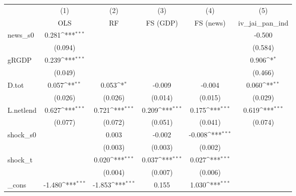 {
\def\sym#1{\ifmmode^{#1}\else\(^{#1}\)\fi}
\begin{tabular}{l*{5}{c}}
\toprule
            &\multicolumn{1}{c}{(1)}&\multicolumn{1}{c}{(2)}&\multicolumn{1}{c}{(3)}&\multicolumn{1}{c}{(4)}&\multicolumn{1}{c}{(5)}\\
            &\multicolumn{1}{c}{OLS}&\multicolumn{1}{c}{RF}&\multicolumn{1}{c}{FS (GDP)}&\multicolumn{1}{c}{FS (news)}&\multicolumn{1}{c}{iv\_jai\_pan\_ind}\\
\midrule
news\_s0     &       0.281\sym{***}&                     &                     &                     &      -0.500         \\
            &     (0.094)         &                     &                     &                     &     (0.584)         \\
\addlinespace
gRGDP       &       0.239\sym{***}&                     &                     &                     &       0.906\sym{*}  \\
            &     (0.049)         &                     &                     &                     &     (0.466)         \\
\addlinespace
D.tot       &       0.057\sym{**} &       0.053\sym{*}  &      -0.009         &      -0.004         &       0.060\sym{**} \\
            &     (0.026)         &     (0.026)         &     (0.014)         &     (0.015)         &     (0.029)         \\
\addlinespace
L.netlend   &       0.627\sym{***}&       0.721\sym{***}&       0.209\sym{***}&       0.175\sym{***}&       0.619\sym{***}\\
            &     (0.077)         &     (0.072)         &     (0.051)         &     (0.041)         &     (0.074)         \\
\addlinespace
shock\_s0    &                     &       0.003         &      -0.002         &      -0.008\sym{***}&                     \\
            &                     &     (0.003)         &     (0.003)         &     (0.002)         &                     \\
\addlinespace
shock\_t     &                     &       0.020\sym{***}&       0.037\sym{***}&       0.027\sym{***}&                     \\
            &                     &     (0.004)         &     (0.007)         &     (0.006)         &                     \\
\addlinespace
\_cons      &      -1.480\sym{***}&      -1.853\sym{***}&       0.155         &       1.030\sym{***}&                     \\

\end{tabular}}
